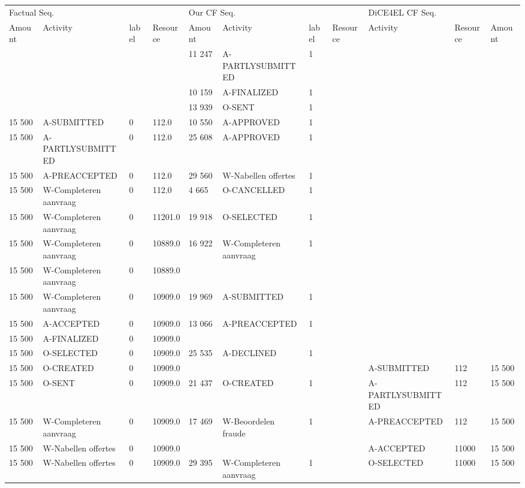 \begin{tabular}{lllllllllll}
\toprule
\multicolumn{4}{l}{Factual Seq.} & \multicolumn{4}{l}{Our CF Seq.} & \multicolumn{3}{l}{DiCE4EL CF Seq.} \\
Amount & Activity & label & Resource & Amount & Activity & label & Resource & Activity & Resource & Amount \\
\midrule
 &  &  &  & 11 247 & A-PARTLYSUBMITTED & 1 &  &  &  &  \\
 &  &  &  & 10 159 & A-FINALIZED & 1 &  &  &  &  \\
 &  &  &  & 13 939 & O-SENT & 1 &  &  &  &  \\
15 500 & A-SUBMITTED & 0 & 112.0 & 10 550 & A-APPROVED & 1 &  &  &  &  \\
15 500 & A-PARTLYSUBMITTED & 0 & 112.0 & 25 608 & A-APPROVED & 1 &  &  &  &  \\
15 500 & A-PREACCEPTED & 0 & 112.0 & 29 560 & W-Nabellen offertes & 1 &  &  &  &  \\
15 500 & W-Completeren aanvraag & 0 & 112.0 & 4 665 & O-CANCELLED & 1 &  &  &  &  \\
15 500 & W-Completeren aanvraag & 0 & 11201.0 & 19 918 & O-SELECTED & 1 &  &  &  &  \\
15 500 & W-Completeren aanvraag & 0 & 10889.0 & 16 922 & W-Completeren aanvraag & 1 &  &  &  &  \\
15 500 & W-Completeren aanvraag & 0 & 10889.0 &  &  &  &  &  &  &  \\
15 500 & W-Completeren aanvraag & 0 & 10909.0 & 19 969 & A-SUBMITTED & 1 &  &  &  &  \\
15 500 & A-ACCEPTED & 0 & 10909.0 & 13 066 & A-PREACCEPTED & 1 &  &  &  &  \\
15 500 & A-FINALIZED & 0 & 10909.0 &  &  &  &  &  &  &  \\
15 500 & O-SELECTED & 0 & 10909.0 & 25 535 & A-DECLINED & 1 &  &  &  &  \\
15 500 & O-CREATED & 0 & 10909.0 &  &  &  &  & A-SUBMITTED & 112 & 15 500 \\
15 500 & O-SENT & 0 & 10909.0 & 21 437 & O-CREATED & 1 &  & A-PARTLYSUBMITTED & 112 & 15 500 \\
15 500 & W-Completeren aanvraag & 0 & 10909.0 & 17 469 & W-Beoordelen fraude & 1 &  & A-PREACCEPTED & 112 & 15 500 \\
15 500 & W-Nabellen offertes & 0 & 10909.0 &  &  &  &  & A-ACCEPTED & 11000 & 15 500 \\
15 500 & W-Nabellen offertes & 0 & 10909.0 & 29 395 & W-Completeren aanvraag & 1 &  & O-SELECTED & 11000 & 15 500 \\

\end{tabular}
